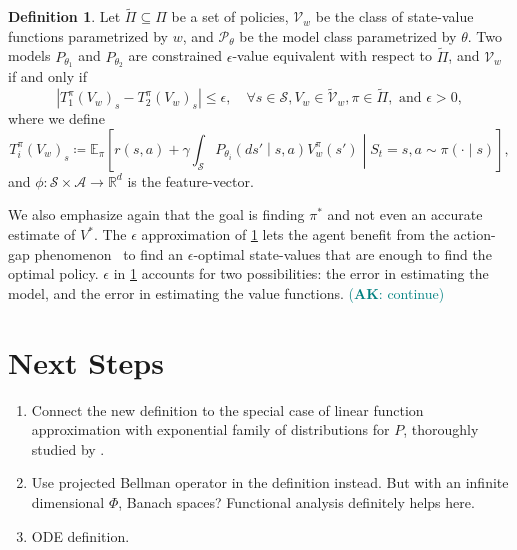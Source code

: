 \documentclass[a4paper]{article}
\theoremstyle{definition}
\newtheorem{definition}{Definition}
\newcommand{\cA}{\mathcal{A}}
\newcommand{\cS}{\mathcal{S}}
\newcommand{\cP}{\mathcal{P}}
\newcommand{\cV}{\mathcal{V}}
\newcommand{\R}{\mathbb{R}}
\newcommand{\E}{\mathbb{E}}
\newcommand{\AK}[1]{\textcolor{teal}{(\textbf{AK}: {#1})}}
\begin{document}
\begin{definition}
    \label{def:cns-val-eq-prin}
    Let $\widetilde{\Pi} \subseteq \Pi$ be a set of policies, $\cV_w$ be the class of state-value functions parametrized by $w$, and $\cP_\theta$ be the model class parametrized by $\theta$. Two models $P_{\theta_1}$ and $P_{\theta_2}$ are constrained $\epsilon$-value equivalent with respect to $\widetilde{\Pi}$, and $\cV_w$ if and only if
    \begin{equation*}
        \left\lvert T^\pi_1(V_w)_s - T^\pi_2(V_w)_s \right\rvert \leq \epsilon, \quad \forall s \in \cS, V_w \in \widetilde{\cV}_w, \pi \in \widetilde{\Pi}, \text{ and } \epsilon > 0,
    \end{equation*}
    where we define
    \begin{equation*}
        T^\pi_i(V_w)_s \coloneq \E_\pi \left[r(s, a) + \gamma \int_\cS P_{\theta_i}\left(ds' \middle\vert s, a\right)V_w^\pi\left(s'\right) \middle\vert S_t = s,  a \sim \pi(\cdot \mid s)\right],
    \end{equation*}
    and $\phi: \cS \times \cA \to \R^d$ is the feature-vector.
\end{definition}
%
We also emphasize again that the goal is finding $\pi^*$ and not even an accurate estimate of $V^*$. The $\epsilon$ approximation of \cref{def:cns-val-eq-prin} lets the agent benefit from the action-gap phenomenon~\citep{farahmand2011actiongap} to find an $\epsilon$-optimal state-values that are enough to find the optimal policy.
\newline
\newline
$\epsilon$ in \cref{def:cns-val-eq-prin} accounts for two possibilities: the error in estimating the model, and the error in estimating the value functions. \AK{continue}

\section{Next Steps}
\begin{enumerate}
    \item Connect the new definition to the special case of linear function approximation with exponential family of distributions for $P$, thoroughly studied by \citet{farahmand2017value}.

    \item Use projected Bellman operator in the definition instead. But with an infinite dimensional $\Phi$, Banach spaces? Functional analysis definitely helps here.
    
     \item ODE definition.
\end{enumerate}


\end{document}
